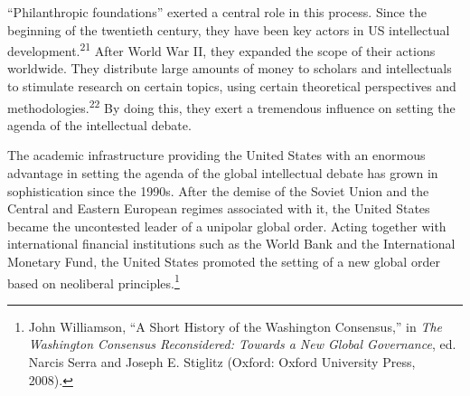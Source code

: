 \documentclass{tufte-handout}
\begin{document}
``Philanthropic foundations'' exerted a central role in this process.
Since the beginning of the twentieth century, they have been key actors
in US intellectual development.\textsuperscript{21} After World War II, they expanded the scope of their
actions worldwide. They distribute large amounts of money to scholars
and intellectuals to stimulate research on certain topics, using certain
theoretical perspectives and methodologies.\textsuperscript{22} By doing this, they exert a tremendous influence on
setting the agenda of the intellectual debate.

The academic infrastructure providing the United States with an enormous
advantage in setting the agenda of the global intellectual debate has
grown in sophistication since the 1990s. After the demise of the Soviet
Union and the Central and Eastern European regimes associated with it,
the United States became the uncontested leader of a unipolar global
order. Acting together with international financial institutions such as
the World Bank and the International Monetary Fund, the United States
promoted the setting of a new global order based on neoliberal
principles.\footnote{John Williamson, ``A Short History of the
  Washington Consensus,'' in \emph{The Washington Consensus
  Reconsidered: Towards a New Global Governance}, ed. Narcis Serra and
  Joseph E. Stiglitz (Oxford: Oxford University Press,
  2008).}
\end{document}
